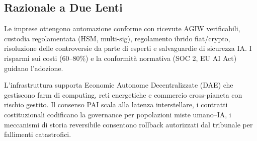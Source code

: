 \documentclass[11pt]{article}
\begin{document}
\subsection{Razionale a Due Lenti}
\begin{description}[style=nextline]
  \item[Breve Termine (Era MERCURY)] Le imprese ottengono automazione conforme con ricevute AGIW verificabili, custodia regolamentata (HSM, multi-sig), regolamento ibrido fiat/crypto, risoluzione delle controversie da parte di esperti e salvaguardie di sicurezza IA. I risparmi sui costi (60--80\%) e la conformità normativa (SOC 2, EU AI Act) guidano l'adozione.
  \item[Century-Scale (da VENUS ad ANDROMEDA)] L'infrastruttura supporta Economie Autonome Decentralizzate (DAE) che gestiscono farm di computing, reti energetiche e commercio cross-pianeta con rischio gestito. Il consenso PAI scala alla latenza interstellare, i contratti costituzionali codificano la governance per popolazioni miste umano--IA, i meccanismi di storia reversibile consentono rollback autorizzati dal tribunale per fallimenti catastrofici.
\end{description}
\end{document}
